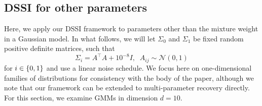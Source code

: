 \documentclass[11pt]{article}
\newcommand{\fitparenth}[1]{\left(#1\right)}
\newcommand{\vect}[1]{\mathbf{#1}}
\theoremstyle{plain}
\newcommand{\1}{\mathbbm{1}}
\DeclarePairedDelimiter{\set}{\lbrace}{\rbrace}
\newcommand{\pdist}[2][]{p_{#1}^{(#2)}}
\begin{document}
\begin{appendices}



\subsection{DSSI for other parameters }\label{sec: Other Parameters}

Here, we apply our DSSI framework to parameters other than the mixture weight in a Gaussian model. In what follows, we will let $\Sigma_0$ and $\Sigma_1$ be fixed random positive definite matrices, such that 
\[\Sigma_i = A^\top A+10^{-8}I, \;\;A_{ij}\sim \mathcal{N}(0,1)\]
for $i\in \set{0,1}$ and use a linear noise schedule. We focus here on one-dimensional families of distributions for consistency with the body of the paper, although we note that our framework can be extended to multi-parameter recovery directly. For this section, we examine GMMs in dimension $d=10$.


\end{appendices}
\end{document}
